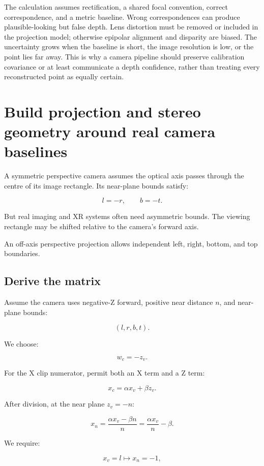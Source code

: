 The calculation assumes rectification, a shared focal convention, correct correspondence, and a metric baseline. Wrong correspondences can produce plausible-looking but false depth. Lens distortion must be removed or included in the projection model; otherwise epipolar alignment and disparity are biased. The uncertainty grows when the baseline is short, the image resolution is low, or the point lies far away. This is why a camera pipeline should preserve calibration covariance or at least communicate a depth confidence, rather than treating every reconstructed point as equally certain.

\section{Build projection and stereo geometry around real camera baselines}\label{02-foundations-ii-ch035-build-projection-and-stereo-geometry-around-real-camera-baselines}

A symmetric perspective camera assumes the optical axis passes through the centre of its image rectangle. Its near-plane bounds satisfy:

\[ l=-r,\qquad b=-t. \]

But real imaging and XR systems often need asymmetric bounds. The viewing rectangle may be shifted relative to the camera's forward axis.

An off-axis perspective projection allows independent left, right, bottom, and top boundaries.

\subsection{Derive the matrix}\label{02-foundations-ii-ch035-derive-the-matrix}

Assume the camera uses negative-Z forward, positive near distance \(n\), and near-plane bounds:

\[ (l,r,b,t). \]

We choose:

\[ w_c=-z_v. \]

For the X clip numerator, permit both an X term and a Z term:

\[ x_c=\alpha x_v+\beta z_v. \]

After division, at the near plane \(z_v=-n\):

\[ x_n=\frac{\alpha x_v-\beta n}{n} =\frac{\alpha x_v}{n}-\beta. \]

We require:

\[ x_v=l\longmapsto x_n=-1, \]

